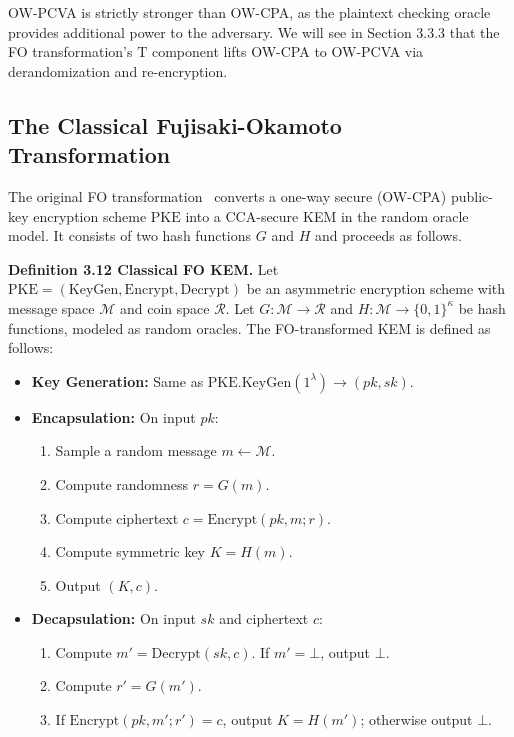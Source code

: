 OW-PCVA is strictly stronger than OW-CPA, as the plaintext checking oracle provides additional power to the adversary. We will see in Section 3.3.3 that the FO transformation's $\text{T}$ component lifts OW-CPA to OW-PCVA via derandomization and re-encryption.

\subsection{The Classical Fujisaki-Okamoto Transformation}

The original FO transformation~\cite{fujisaki1999secure} converts a one-way secure (OW-CPA) public-key encryption scheme $\text{PKE}$ into a CCA-secure KEM in the random oracle model. It consists of two hash functions $G$ and $H$ and proceeds as follows.

\noindent\textbf{Definition 3.12 Classical FO KEM.} Let $\text{PKE} = (\text{KeyGen}, \text{Encrypt}, \text{Decrypt})$ be an asymmetric encryption scheme with message space $\mathcal{M}$ and coin space $\mathcal{R}$. Let $G: \mathcal{M} \to \mathcal{R}$ and $H: \mathcal{M} \to \{0,1\}^{\kappa}$ be hash functions, modeled as random oracles. The FO-transformed KEM is defined as follows:
\begin{itemize}
    \item \textbf{Key Generation:} Same as $\text{PKE.KeyGen}(1^\lambda) \to (pk, sk)$.
    \item \textbf{Encapsulation:} On input $pk$:
    \begin{enumerate}
        \item Sample a random message $m \gets \mathcal{M}$.
        \item Compute randomness $r = G(m)$.
        \item Compute ciphertext $c = \text{Encrypt}(pk, m; r)$.
        \item Compute symmetric key $K = H(m)$.
        \item Output $(K, c)$.
    \end{enumerate}
    \item \textbf{Decapsulation:} On input $sk$ and ciphertext $c$:
    \begin{enumerate}
        \item Compute $m' = \text{Decrypt}(sk, c)$. If $m' = \bot$, output $\bot$.
        \item Compute $r' = G(m')$.
        \item If $\text{Encrypt}(pk, m'; r') = c$, output $K = H(m')$; otherwise output $\bot$.
    \end{enumerate}
\end{itemize}

